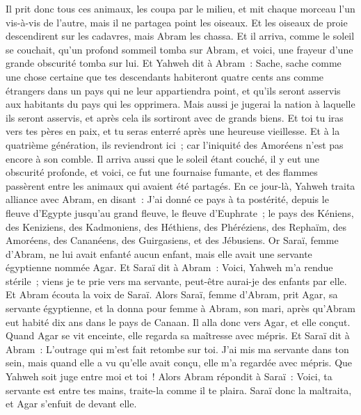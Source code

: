 \begin{multicols}{2}
Il prit donc tous ces animaux, les coupa par le milieu, et mit chaque morceau l'un vis-à-vis de l'autre, mais il ne partagea point les oiseaux.
Et les oiseaux de proie descendirent sur les cadavres, mais Abram les chassa.
Et il arriva, comme le soleil se couchait, qu'un profond sommeil tomba sur Abram, et voici, une frayeur d'une grande obscurité tomba sur lui.
Et Yahweh dit à Abram~: Sache, sache comme une chose certaine que tes descendants habiteront quatre cents ans comme étrangers dans un pays qui ne leur appartiendra point, et qu'ils seront asservis aux habitants du pays qui les opprimera.
Mais aussi je jugerai la nation à laquelle ils seront asservis, et après cela ils sortiront avec de grands biens.
Et toi tu iras vers tes pères en paix, et tu seras enterré après une heureuse vieillesse.
Et à la quatrième génération, ils reviendront ici~; car l'iniquité des Amoréens n'est pas encore à son comble.
Il arriva aussi que le soleil étant couché, il y eut une obscurité profonde, et voici, ce fut une fournaise fumante, et des flammes passèrent entre les animaux qui avaient été partagés.
En ce jour-là, Yahweh traita alliance avec Abram, en disant~: J'ai donné ce pays à ta postérité, depuis le fleuve d'Egypte jusqu'au grand fleuve, le fleuve d'Euphrate~;
le pays des Kéniens, des Keniziens, des Kadmoniens,
des Héthiens, des Phéréziens, des Rephaïm,
des Amoréens, des Cananéens, des Guirgasiens, et des Jébusiens.
\VerseOne{}Or Saraï, femme d'Abram, ne lui avait enfanté aucun enfant, mais elle avait une servante égyptienne nommée Agar.
Et Saraï dit à Abram~: Voici, Yahweh m'a rendue stérile~; viens je te prie vers ma servante, peut-être aurai-je des enfants par elle. Et Abram écouta la voix de Saraï.
Alors Saraï, femme d'Abram, prit Agar, sa servante égyptienne, et la donna pour femme à Abram, son mari, après qu'Abram eut habité dix ans dans le pays de Canaan.
Il alla donc vers Agar, et elle conçut. Quand Agar se vit enceinte, elle regarda sa maîtresse avec mépris.
Et Saraï dit à Abram~: L'outrage qui m'est fait retombe sur toi. J'ai mis ma servante dans ton sein, mais quand elle a vu qu'elle avait conçu, elle m'a regardée avec mépris. Que Yahweh soit juge entre moi et toi~!
Alors Abram répondit à Saraï~: Voici, ta servante est entre tes mains, traite-la comme il te plaira. Saraï donc la maltraita, et Agar s'enfuit de devant elle.

\end{multicols}
